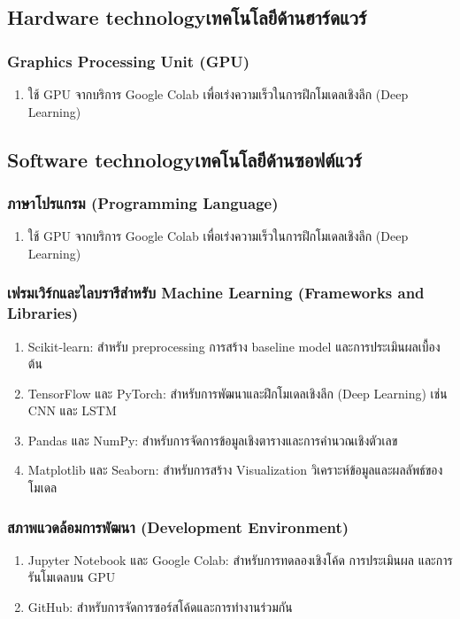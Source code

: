 \subsection{\ifenglish Hardware technology\else เทคโนโลยีด้านฮาร์ดแวร์\fi}

\subsubsection{Graphics Processing Unit (GPU)}
\begin{enumerate}
    \item ใช้ GPU จากบริการ Google Colab เพื่อเร่งความเร็วในการฝึกโมเดลเชิงลึก (Deep Learning)
\end{enumerate}

\subsection{\ifenglish Software technology\else เทคโนโลยีด้านซอฟต์แวร์\fi}

\subsubsection{ภาษาโปรแกรม (Programming Language)}
\begin{enumerate}
    \item ใช้ GPU จากบริการ Google Colab เพื่อเร่งความเร็วในการฝึกโมเดลเชิงลึก (Deep Learning)
\end{enumerate}

\subsubsection{เฟรมเวิร์กและไลบรารีสำหรับ Machine Learning (Frameworks and Libraries)}
\begin{enumerate}
    \item Scikit-learn: สำหรับ preprocessing การสร้าง baseline model และการประเมินผลเบื้องต้น
    \item TensorFlow และ PyTorch: สำหรับการพัฒนาและฝึกโมเดลเชิงลึก (Deep Learning) เช่น CNN และ LSTM
    \item Pandas และ NumPy: สำหรับการจัดการข้อมูลเชิงตารางและการคำนวณเชิงตัวเลข
    \item Matplotlib และ Seaborn: สำหรับการสร้าง Visualization วิเคราะห์ข้อมูลและผลลัพธ์ของโมเดล
\end{enumerate}

\subsubsection{สภาพแวดล้อมการพัฒนา (Development Environment)}
\begin{enumerate}
    \item Jupyter Notebook และ Google Colab: สำหรับการทดลองเชิงโค้ด การประเมินผล และการรันโมเดลบน GPU
    \item GitHub: สำหรับการจัดการซอร์สโค้ดและการทำงานร่วมกัน
\end{enumerate}

